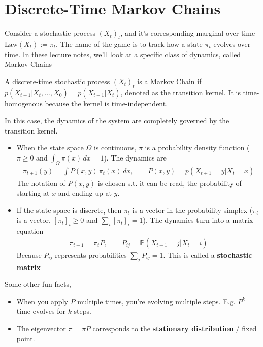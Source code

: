 \section{Discrete-Time Markov Chains}
Consider a stochastic process $(X_t)_t$, and it's corresponding marginal over time $\text{Law}(X_t) := \pi_t$. The name of the game is to track how a state $\pi_t$ evolves over time. In these lecture notes, we'll look at a specific class of dynamics, called Markov Chains
\begin{definition}
	 A discrete-time stochastic process $(X_t)_t$ is a Markov Chain if $p(X_{t+1} | X_t, ..., X_0) = p(X_{t+1} | X_t)$, denoted as the transition kernel. It is time-homogenous because the kernel is time-independent.
\end{definition}
In this case, the dynamics of the system are completely governed by the transition kernel. 
\begin{itemize}
	\item When the state space $\Omega$ is continuous, $\pi$ is a probability density function ($\pi \geq 0$ and $\int_\Omega \pi(x) \, dx = 1$). The dynamics are
	\begin{align}
		\pi_{t+1}(y) = \int P(x,y)\,  \pi_t(x) \, dx, \qquad P(x,y) = p(X_{t+1} = y| X_t = x)
	\end{align}
	The notation of $P(x,y)$ is chosen s.t. it can be read, the probability of starting at $x$ and ending up at $y$.
	\item If the state space is discrete, then $\pi_t$ is a vector in the probability simplex ($\pi_t$ is a vector, $[\pi_t]_i \geq 0$ and $\sum_i [\pi_t]_i = 1$). The dynamics turn into a matrix equation
	\begin{align}
		\pi_{t+1} = \pi_t P, \qquad P_{ij} = \mathbb P(X_{t+1} = j | X_t = i)
	\end{align}
	Because $P_{ij}$ represents probabilities $\sum_j P_{ij} = 1$. This is called a \textbf{stochastic matrix}
\end{itemize}
Some other fun facts,
\begin{itemize}
	\item When you apply $P$ multiple times, you're evolving multiple steps. E.g. $P^k$ time evolves for $k$ steps.
	\item The eigenvector $\pi = \pi P$ corresponds to the \textbf{stationary distribution} / fixed point.
\end{itemize}

